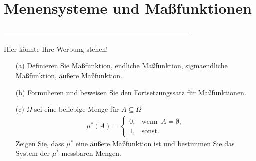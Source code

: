 \setcounter{exercise}{0}

\section{Menensysteme und Maßfunktionen}

--------------------------------------------------------------------------------

\begin{exercise}

Hier könnte Ihre Werbung stehen!

\begin{itemize}
  \item[(a)] Definieren Sie Maßfunktion, endliche Maßfunktion, sigmaendliche Maßfunktion, äußere Maßfunktion.
  \item[(b)] Formulieren und beweisen Sie den Fortsetzungssatz für Maßfunktionen.
  \item[(c)] $\Omega$ sei eine beliebige Menge für $A \subseteq \Omega$
  \begin{align*}
    \mu^\ast(A) =
    \begin{cases}
      0, & \text{wenn} \enspace A = \emptyset, \\
      1, & \text{sonst}.
    \end{cases}
  \end{align*}
  Zeigen Sie, dass $\mu^\ast$ eine äußere Maßfunktion ist und bestimmen Sie das System der $\mu^\ast$-messbaren Mengen.
\end{itemize}

\end{exercise}

